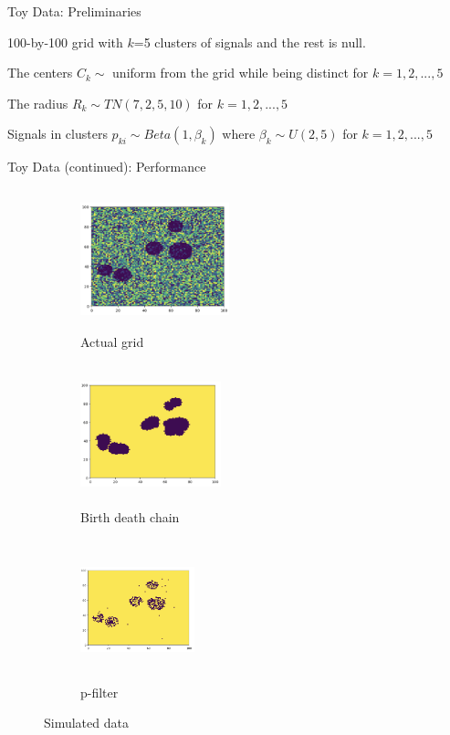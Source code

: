 \documentclass[10pt,mathserif]{beamer}
\begin{document}
\begin{frame} {Toy Data: Preliminaries}
\BIT
\item 100-by-100 grid with $k$=5 clusters of signals and the rest is null.
\item The centers $C_k \sim$  uniform from the grid while being distinct for $k = 1, 2, ..., 5$
\item The radius $R_k \sim T N (7, 2, 5, 10)$ for $k = 1, 2, ..., 5$
\item Signals in clusters $p_{ki} \sim Beta(1, \beta_k)$ where $\beta_k \sim U (2, 5)$ for $k = 1, 2, ..., 5$
\EIT
\end{frame}

\begin{frame} {Toy Data (continued): Performance }
\begin{figure}[t!]
    \centering
    \begin{subfigure}[t]{0.3\textwidth}
        \centering
        \includegraphics[height=1.6in, width=1.7in]{../Actual_grid}
        \caption{Actual grid}
    \end{subfigure}%
    \begin{subfigure}[t]{0.3\textwidth}
        \centering
        \includegraphics[height=1.6in, width=1.6in]{../BDC_grid}
        \caption{Birth death chain}
    \end{subfigure}%
    \begin{subfigure}[t]{0.3\textwidth}
        \centering
        \includegraphics[height=1.6in, width=1.3in]{../pfilter_grid}
        \caption{p-filter}
    \end{subfigure}
    \caption{Simulated data}
\end{figure}
\end{frame}
\end{document}
